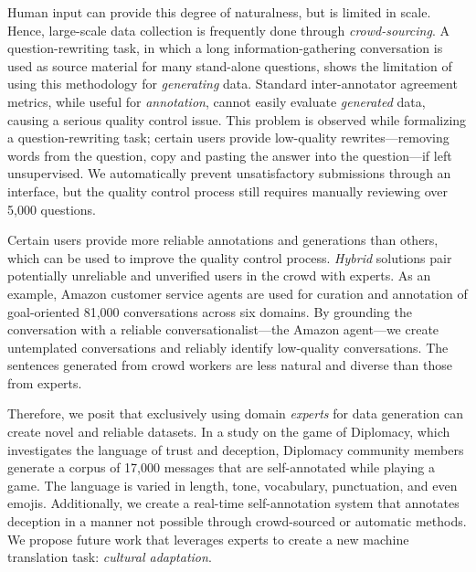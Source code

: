 Human input can provide this degree of naturalness, but is limited in scale. 
%
Hence, large-scale data collection is frequently done through \textit{crowd-sourcing}.
%
A question-rewriting task, in which a long information-gathering conversation is used as source material for many stand-alone questions, shows the limitation of using this methodology for \textit{generating} data.
%
Standard inter-annotator agreement metrics, while useful for \textit{annotation}, cannot easily evaluate \textit{generated} data, causing a serious quality control issue.  
%
This problem is observed while formalizing a question-rewriting task; certain users provide low-quality rewrites---removing words from the question, copy and pasting the answer into the question---if left unsupervised.  
%
We automatically prevent unsatisfactory submissions through an interface, but the quality control process still requires manually reviewing over 5,000 questions.  

Certain users provide more reliable annotations and generations than others, which can be used to improve the quality control process.  
%
\textit{Hybrid} solutions pair potentially unreliable and unverified users in the crowd with experts.  
%
As an example, Amazon customer service agents are used for curation and annotation of goal-oriented 81,000 conversations across six domains.  
%
By grounding the conversation with a reliable conversationalist---the Amazon agent---we create untemplated conversations and reliably identify low-quality conversations.    
%
The sentences generated from crowd workers are less natural and diverse than those from experts.   

Therefore, we posit that exclusively using domain \textit{experts} for data generation can create novel and reliable  datasets. 
%
In a study on the game of Diplomacy, which investigates the language of trust and deception, Diplomacy community members generate a corpus of 17,000 messages that are self-annotated while playing a game. 
%
The language is varied in length, tone, vocabulary, punctuation, and even emojis.
%
Additionally, we create a real-time self-annotation system that annotates deception in a manner not possible through  crowd-sourced or automatic methods.  
We propose future work that leverages experts to create a new machine translation task: \textit{cultural adaptation}.  
 
